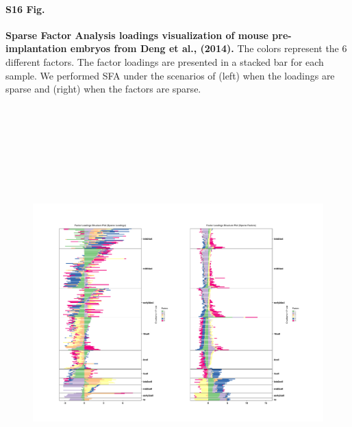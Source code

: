 \documentclass[10pt,letterpaper]{article}
\begin{document}
\paragraph*{S16 Fig.}

\label{figS16}
{\bf Sparse Factor Analysis loadings visualization of mouse pre-implantation embryos from Deng et al., (2014).} The colors represent the 6 different factors. The factor loadings are presented in a stacked bar for each sample. We performed SFA under the scenarios of (left) when the loadings are sparse and (right) when the factors are sparse.


\begin{figure}[ht]
\centering
\includegraphics[height=6.3in, width=7in]{../../plots/deng-figures/sfa_deng_figs.pdf}
\end{figure}
\end{document}
